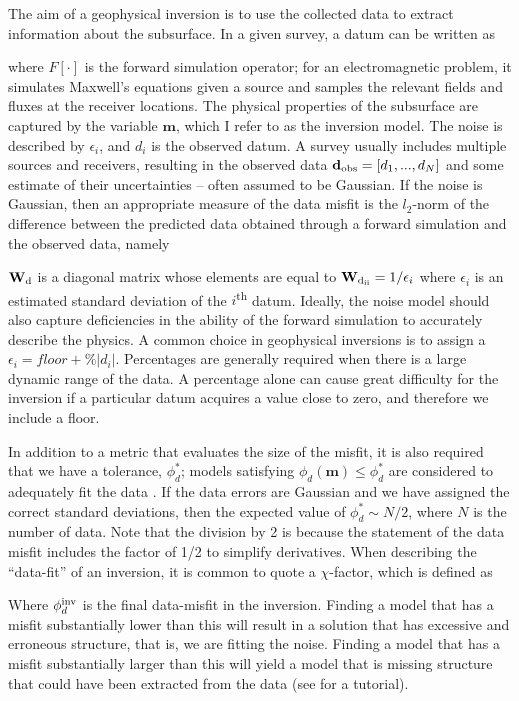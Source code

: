 The aim of a geophysical inversion is to use the collected data to extract information about the subsurface. In a given survey, a datum can be written as

where $F[\cdot]$ is the forward simulation operator; for an electromagnetic problem, it simulates Maxwell's equations given a source and samples the relevant fields and fluxes at the receiver locations. The physical properties of the subsurface are captured by the variable $\mathbf{m}$, which I refer to as the inversion model. The noise is described by $\epsilon_i$, and $d_i$ is the observed datum. A survey usually includes multiple sources and receivers, resulting in the observed data $\mathbf{d}_{\rm obs} = [d_1, ... , d_N]$ and some estimate of their uncertainties -- often assumed to be Gaussian. If the noise is Gaussian, then an appropriate measure of the data misfit is the $l_2$-norm of the difference between the predicted data obtained through a forward simulation and the observed data, namely

$\mathbf{W}_{\rm d}$ is a diagonal matrix whose elements are equal to $\mathbf{W}_{\rm d_{ii}}=1/\epsilon_i$ where $\epsilon_i$ is an estimated standard deviation of the $i$\textsuperscript{th} datum. Ideally, the noise model should also capture deficiencies in the ability of the forward simulation to accurately describe the physics. A common choice in geophysical inversions is to assign a $\epsilon_i = floor + \%|d_i|$.
Percentages are generally required when there is a large dynamic range of the data. A percentage alone can cause great difficulty for the inversion if a particular datum acquires a value close to zero, and therefore we include a floor.

In addition to a metric that evaluates the size of the misfit, it is also required that we have a tolerance, $\phi_d^*$; models satisfying $\phi_d(\mathbf{m}) \leq \phi_d^*$ are considered to adequately fit the data \citep{Parker1994}. If the data errors are Gaussian and we have assigned the correct standard deviations, then the expected value of $\phi_d^* \sim N/2$, where $N$ is the number of data. Note that the division by 2 is because the statement of the data misfit includes the factor of 1/2 to simplify derivatives. When describing the ``data-fit'' of an inversion, it is common to quote a $\chi$-factor, which is defined as

Where $\phi_d^{\rm inv}$ is the final data-misfit in the inversion.  Finding a model that has a misfit substantially lower than this will result in a solution that has excessive and erroneous structure, that is, we are fitting the noise. Finding a model that has a misfit substantially larger than this will yield a model that is missing structure that could have been extracted from the data (see \cite{Oldenburg2005} for a tutorial).

